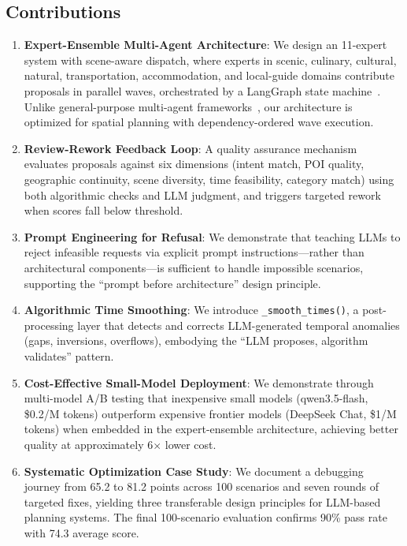 \subsection{Contributions}

\begin{enumerate}[leftmargin=*]
    \item \textbf{Expert-Ensemble Multi-Agent Architecture}: We design an 11-expert system with scene-aware dispatch, where experts in scenic, culinary, cultural, natural, transportation, accommodation, and local-guide domains contribute proposals in parallel waves, orchestrated by a LangGraph state machine~\cite{langgraph2024}. Unlike general-purpose multi-agent frameworks~\cite{wu2023autogen,crewai2024}, our architecture is optimized for spatial planning with dependency-ordered wave execution.

    \item \textbf{Review-Rework Feedback Loop}: A quality assurance mechanism evaluates proposals against six dimensions (intent match, POI quality, geographic continuity, scene diversity, time feasibility, category match) using both algorithmic checks and LLM judgment, and triggers targeted rework when scores fall below threshold.

    \item \textbf{Prompt Engineering for Refusal}: We demonstrate that teaching LLMs to reject infeasible requests via explicit prompt instructions---rather than architectural components---is sufficient to handle impossible scenarios, supporting the ``prompt before architecture'' design principle.

    \item \textbf{Algorithmic Time Smoothing}: We introduce \texttt{\_smooth\_times()}, a post-processing layer that detects and corrects LLM-generated temporal anomalies (gaps, inversions, overflows), embodying the ``LLM proposes, algorithm validates'' pattern.

    \item \textbf{Cost-Effective Small-Model Deployment}: We demonstrate through multi-model A/B testing that inexpensive small models (qwen3.5-flash, \$0.2/M tokens) outperform expensive frontier models (DeepSeek Chat, \$1/M tokens) when embedded in the expert-ensemble architecture, achieving better quality at approximately 6$\times$ lower cost.

    \item \textbf{Systematic Optimization Case Study}: We document a debugging journey from 65.2 to 81.2 points across 100 scenarios and seven rounds of targeted fixes, yielding three transferable design principles for LLM-based planning systems. The final 100-scenario evaluation confirms 90\% pass rate with 74.3 average score.
\end{enumerate}
